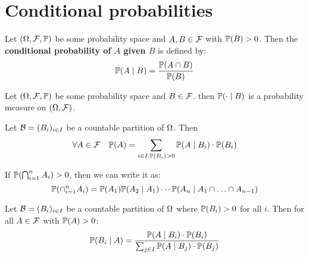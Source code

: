 \section{Conditional probabilities}

\begin{definition*}
  Let \((\O, \F, \P)\) be some probability space and \(A, B \in \F\) with \(\P(B) > 0\). Then the \textbf{conditional probability of \(A\) given \(B\)} is defined by:
  \[\P(A \mid B) = \frac{\P(A \cap B)}{\P(B)}\]
\end{definition*}

\begin{proposition}
  Let \((\O, \F, \P)\) be some probability space and \(B \in \F\). then \(\P(\cdot \mid B)\) is a probability measure on \((\O, \F)\).
\end{proposition}

\begin{theorem*}
  Let \(\B = (B_i)_{i \in I}\) be a countable partition of \(\O\). Then
  \[\forall A \in \F \quad \P(A) = \sum_{i \in I: \P(B_i) > 0} \P(A \mid B_i) \cdot \P(B_i)\]
\end{theorem*}

\begin{theorem*}
  If \(\P(\bigcap_{i=1}^n A_i) > 0\), then we can write it as:
 \[ \P(\cap_{i=1}^n A_i) = \P(A_1) \P(A_2 \mid A_1) \cdots \P(A_n \mid A_1 \cap \ldots \cap A_{n-1})\]
\end{theorem*}

\begin{theorem*}
  Let \(\B = (B_i)_{i \in I}\) be a countable partition of \(\O\) where \(\P(B_i) > 0\) for all \(i\). Then for all \(A \in \F\) with \(\P(A) > 0\):
  \[\P(B_i \mid A) = \frac{\P(A \mid B_i) \cdot \P(B_i)}{\sum_{j \in I} \P(A \mid B_j) \cdot \P(B_j)}\]
\end{theorem*}

